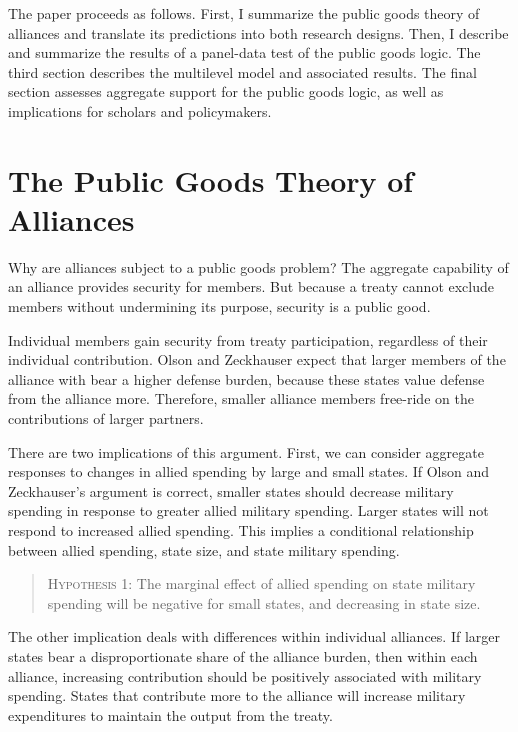 \documentclass[12pt]{article}
\begin{document}
The paper proceeds as follows.
First, I summarize the public goods theory of alliances and translate its predictions into both research designs.
Then, I describe and summarize the results of a panel-data test of the public goods logic.
The third section describes the multilevel model and associated results. 
The final section assesses aggregate support for the public goods logic, as well as implications for scholars and policymakers. 


\section{The Public Goods Theory of Alliances}


Why are alliances subject to a public goods problem? 
The aggregate capability of an alliance provides security for members. 
But because a treaty cannot exclude members without undermining its purpose, security is a public good. 


Individual members gain security from treaty participation, regardless of their individual contribution. 
Olson and Zeckhauser expect that larger members of the alliance with bear a higher defense burden, because these states value defense from the alliance more. 
Therefore, smaller alliance members free-ride on the contributions of larger partners. 


There are two implications of this argument. 
First, we can consider aggregate responses to changes in allied spending by large and small states. 
If Olson and Zeckhauser's argument is correct, smaller states should decrease military spending in response to greater allied military spending. 
Larger states will not respond to increased allied spending. 
This implies a conditional relationship between allied spending, state size, and state military spending. 


\begin{quote}
\textsc{Hypothesis 1}: The marginal effect of allied spending on state military spending will be negative for small states, and decreasing in state size. 
\end{quote}


The other implication deals with differences within individual alliances. 
If larger states bear a disproportionate share of the alliance burden, then within each alliance, increasing contribution should be positively associated with military spending. 
States that contribute more to the alliance will increase military expenditures to maintain the output from the treaty. 
\end{document}
